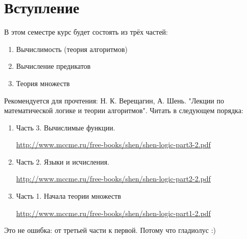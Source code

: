 \section{Вступление}
В этом семестре курс будет состоять из трёх частей:
\begin{enumerate}
	\item Вычислимость (теория алгоритмов)
	\item Вычисление предикатов
	\item Теория множеств
\end{enumerate}
Рекомендуется для прочтения: Н. К. Верещагин, А. Шень. "Лекции по математической логике и теории алгоритмов".
Читать в следующем порядка:
\begin{enumerate}
	\item
		Часть 3. Вычислимые функции.

		\url{http://www.mccme.ru/free-books/shen/shen-logic-part3-2.pdf}

	\item
		Часть 2. Языки и исчисления.

		\url{http://www.mccme.ru/free-books/shen/shen-logic-part2-2.pdf}

	\item
		Часть 1. Начала теории множеств

		\url{http://www.mccme.ru/free-books/shen/shen-logic-part1-2.pdf}
\end{enumerate}
Это не ошибка: от третьей части к первой.
Потому что гладиолус :)
